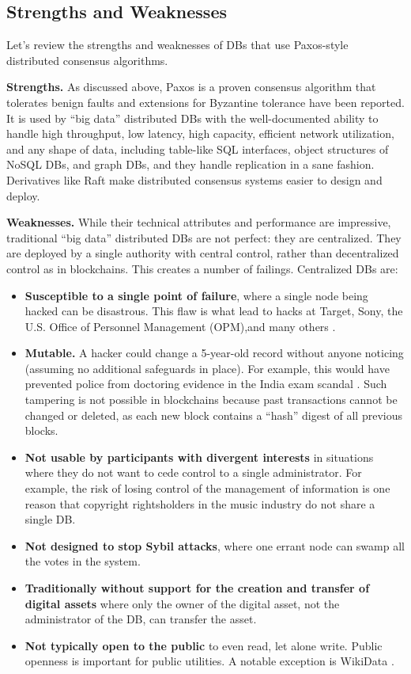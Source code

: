 \subsection{Strengths and Weaknesses}
Let’s review the strengths and weaknesses of DBs that use Paxos-style distributed consensus algorithms.

\medskip
\noindent\textbf{Strengths.} As discussed above, Paxos is a proven consensus algorithm that tolerates benign faults and extensions for Byzantine tolerance have been reported.
It is used by “big data” distributed DBs with the well-documented ability to handle high throughput, low latency, high capacity, efficient network utilization, and any shape of data, including table-like SQL interfaces, object structures of NoSQL DBs, and graph DBs, and they handle replication in a sane fashion.
Derivatives like Raft make distributed consensus systems easier to design and deploy.

\medskip
\noindent\textbf{Weaknesses.} While their technical attributes and performance are impressive, traditional “big data” distributed DBs are not perfect: they are centralized.
They are deployed by a single authority with central control, rather than decentralized control as in blockchains.
This creates a number of failings.
Centralized DBs are:
\begin{itemize}
  \item \textbf{Susceptible to a single point of failure}, where a single node being hacked can be disastrous. This flaw is what lead to hacks at Target, Sony, the U.S. Office of Personnel Management (OPM),and many others \cite{bluestone2014sony_hack, davis2015hacking}.
  \item \textbf{Mutable.} A hacker could change a 5-year-old record without anyone noticing (assuming no additional safeguards in place). For example, this would have prevented police from doctoring evidence in the India exam scandal \cite{sethy2015india_scam}. Such tampering is not possible in blockchains because past transactions cannot be changed or deleted, as each new block contains a “hash” digest of all previous blocks.
  \item \textbf{Not usable by participants with divergent interests} in situations where they do not want to cede control to a single administrator. For example, the risk of losing control of the management of information is one reason that copyright rightsholders in the music industry do not share a single DB.
  \item \textbf{Not designed to stop Sybil attacks}, where one errant node can swamp all the votes in the system.
  \item \textbf{Traditionally without support for the creation and transfer of digital assets} where only the owner of the digital asset, not the administrator of the DB, can transfer the asset.
  \item \textbf{Not typically open to the public} to even read, let alone write. Public openness is important for public utilities. A notable exception is WikiData \cite{wikidata}.
\end{itemize}

